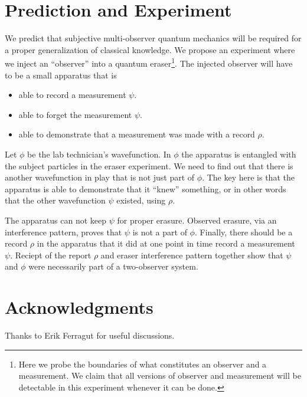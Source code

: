 \documentclass[12pt,a4paper]{article}
\begin{document}
\section{Prediction and Experiment}

We predict that subjective multi-observer quantum mechanics will be required for a proper generalization of classical knowledge.  We propose an experiment where we inject an ``observer'' into a quantum eraser\footnote{Here we probe the boundaries of what constitutes an observer and a measurement.  We claim that all versions of observer and measurement will be detectable in this experiment whenever it can be done.}.  The injected observer will have to be a small apparatus that is
\begin{itemize}
   \item able to record a measurement $\psi$.
   \item able to forget the measurement $\psi$.
   \item able to demonstrate that a measurement was made with a record $\rho$.
\end{itemize}
Let $\phi$ be the lab technician's wavefunction.  In $\phi$ the apparatus is entangled with the subject particles in the eraser experiment.  We need to find out that there is another wavefunction in play that is not just part of $\phi$.  The key here is that the apparatus is able to demonstrate that it ``knew'' something, or in other words that the other wavefunction $\psi$ existed, using $\rho$.

The apparatus can not keep $\psi$ for proper erasure.  Observed erasure, via an interference pattern, proves that $\psi$ is not a part of $\phi$.  Finally, there should be a record $\rho$ in the apparatus that it did at one point in time record a measurement $\psi$.  Reciept of the report $\rho$ and eraser interference pattern together show that $\psi$ and $\phi$ were necessarily part of a two-observer system.

\section{Acknowledgments}
Thanks to Erik Ferragut for useful discussions.



\end{document}
